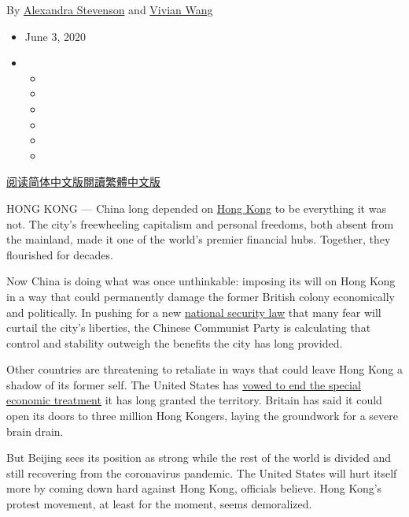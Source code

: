 By
\href{https://www.nytimes3xbfgragh.onion/by/alexandra-stevenson}{Alexandra
Stevenson} and
\href{https://www.nytimes3xbfgragh.onion/by/vivian-wang}{Vivian Wang}

\begin{itemize}
\item
  June 3, 2020
\item
  \begin{itemize}
  \item
  \item
  \item
  \item
  \item
  \item
  \end{itemize}
\end{itemize}

\href{https://cn.nytimes3xbfgragh.onion/china/20200604/china-hong-kong-damage/}{阅读简体中文版}\href{https://cn.nytimes3xbfgragh.onion/china/20200604/china-hong-kong-damage/zh-hant/}{閱讀繁體中文版}

HONG KONG --- China long depended on
\href{https://www.nytimes3xbfgragh.onion/2020/06/29/business/economy/us-halts-high-tech-exports-hong-kong.html}{Hong
Kong} to be everything it was not. The city's freewheeling capitalism
and personal freedoms, both absent from the mainland, made it one of the
world's premier financial hubs. Together, they flourished for decades.

Now China is doing what was once unthinkable: imposing its will on Hong
Kong in a way that could permanently damage the former British colony
economically and politically. In pushing for a new
\href{https://www.nytimes3xbfgragh.onion/2020/07/07/business/hong-kong-security-law-tech.html}{national
security law} that many fear will curtail the city's liberties, the
Chinese Communist Party is calculating that control and stability
outweigh the benefits the city has long provided.

Other countries are threatening to retaliate in ways that could leave
Hong Kong a shadow of its former self. The United States has
\href{https://www.nytimes3xbfgragh.onion/2020/05/29/us/politics/trump-hong-kong-china-WHO.html}{vowed
to end the special economic treatment} it has long granted the
territory. Britain has said it could open its doors to three million
Hong Kongers, laying the groundwork for a severe brain drain.

But Beijing sees its position as strong while the rest of the world is
divided and still recovering from the coronavirus pandemic. The United
States will hurt itself more by coming down hard against Hong Kong,
officials believe. Hong Kong's protest movement, at least for the
moment, seems demoralized.

